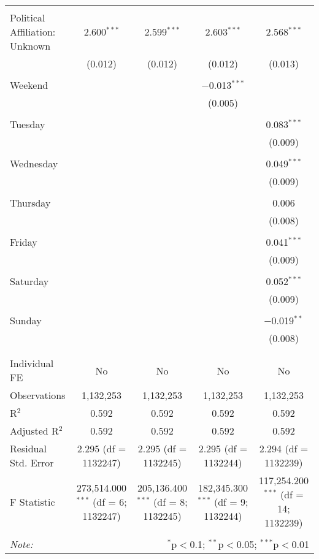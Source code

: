 \documentclass[
]{article}
\begin{document}
\begin{table}[!htbp]
{\begin{tabular}{@{\extracolsep{5pt}}lcccc}
  & & & & \\ 
 Political Affiliation: Unknown & 2.600$^{***}$ & 2.599$^{***}$ & 2.603$^{***}$ & 2.568$^{***}$ \\ 
  & (0.012) & (0.012) & (0.012) & (0.013) \\ 
  & & & & \\ 
 Weekend &  &  & $-$0.013$^{***}$ &  \\ 
  &  &  & (0.005) &  \\ 
  & & & & \\ 
 Tuesday &  &  &  & 0.083$^{***}$ \\ 
  &  &  &  & (0.009) \\ 
  & & & & \\ 
 Wednesday &  &  &  & 0.049$^{***}$ \\ 
  &  &  &  & (0.009) \\ 
  & & & & \\ 
 Thursday &  &  &  & 0.006 \\ 
  &  &  &  & (0.008) \\ 
  & & & & \\ 
 Friday &  &  &  & 0.041$^{***}$ \\ 
  &  &  &  & (0.009) \\ 
  & & & & \\ 
 Saturday &  &  &  & 0.052$^{***}$ \\ 
  &  &  &  & (0.009) \\ 
  & & & & \\ 
 Sunday &  &  &  & $-$0.019$^{**}$ \\ 
  &  &  &  & (0.008) \\ 
  & & & & \\ 
\hline \\[-1.8ex] 
Individual FE & No & No & No & No \\ 
Observations & 1,132,253 & 1,132,253 & 1,132,253 & 1,132,253 \\ 
R$^{2}$ & 0.592 & 0.592 & 0.592 & 0.592 \\ 
Adjusted R$^{2}$ & 0.592 & 0.592 & 0.592 & 0.592 \\ 
Residual Std. Error & 2.295 (df = 1132247) & 2.295 (df = 1132245) & 2.295 (df = 1132244) & 2.294 (df = 1132239) \\ 
F Statistic & 273,514.000$^{***}$ (df = 6; 1132247) & 205,136.400$^{***}$ (df = 8; 1132245) & 182,345.300$^{***}$ (df = 9; 1132244) & 117,254.200$^{***}$ (df = 14; 1132239) \\ 
\hline 
\hline \\[-1.8ex] 
\textit{Note:}  & \multicolumn{4}{r}{$^{*}$p$<$0.1; $^{**}$p$<$0.05; $^{***}$p$<$0.01} \\ 
\end{tabular}
} 
\end{table} 
\newpage
\end{document}
